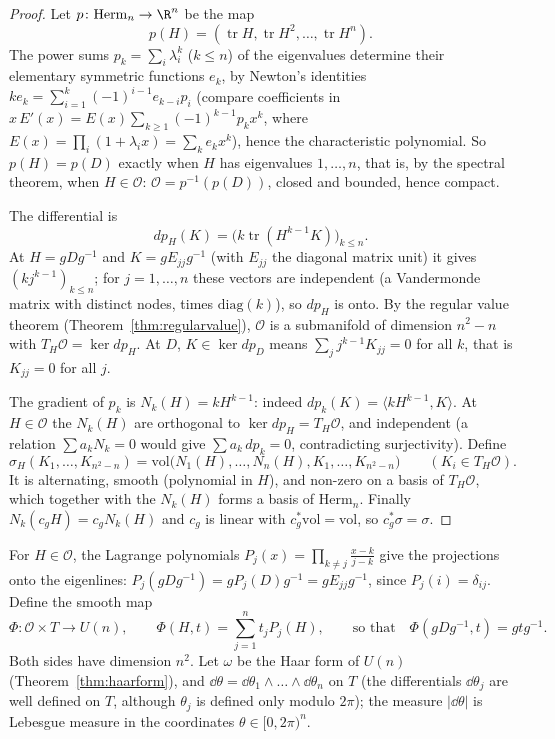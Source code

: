 \begin{proof}
Let $p\colon\mathrm{Herm}_n\to\R^n$ be the map
\[p(H)=(\operatorname{tr}H,\operatorname{tr}H^2,\dots,\operatorname{tr}H^n).\]
The power sums $p_k=\sum_i\lambda_i^k$ ($k\le n$) of the eigenvalues determine their elementary symmetric functions
$e_k$, by Newton's identities $ke_k=\sum_{i=1}^k(-1)^{i-1}e_{k-i}p_i$ (compare coefficients in $x\,E'(x)=E(x)\sum_{k\ge1}(-1)^{k-1}p_kx^k$, where $E(x)=\prod_i(1+\lambda_ix)=\sum_ke_kx^k$), hence the characteristic
polynomial. So $p(H)=p(D)$ exactly when $H$ has eigenvalues $1,\dots,n$, that is, by the spectral theorem, when $H\in\mathcal O$: $\mathcal O=p^{-1}(p(D))$, closed and bounded, hence compact.

The differential is
\[dp_H(K)=\bigl(k\operatorname{tr}(H^{k-1}K)\bigr)_{k\le n}.\]
At $H=gDg^{-1}$ and $K=gE_{jj}g^{-1}$ (with $E_{jj}$ the diagonal matrix unit) it gives $(kj^{k-1})_{k\le n}$; for
$j=1,\dots,n$ these vectors are independent (a Vandermonde matrix with distinct nodes, times $\mathrm{diag}(k)$), so $dp_H$ is onto. By the regular value theorem
(Theorem~\ref{thm:regularvalue}), $\mathcal O$ is a submanifold of dimension $n^2-n$ with $T_H\mathcal O=\ker dp_H$. At $D$, $K\in\ker dp_D$ means $\sum_jj^{k-1}K_{jj}=0$ for all $k$, that is
$K_{jj}=0$ for all $j$.

The gradient of $p_k$ is $N_k(H)=kH^{k-1}$: indeed $dp_k(K)=\langle kH^{k-1},K\rangle$. At $H\in\mathcal O$ the $N_k(H)$ are orthogonal to $\ker dp_H=T_H\mathcal O$, and independent (a relation $\sum a_kN_k=0$
would give $\sum a_k\,dp_k=0$, contradicting surjectivity). Define
\[\sigma_H(K_1,\dots,K_{n^2-n})=\mathrm{vol}\bigl(N_1(H),\dots,N_n(H),K_1,\dots,K_{n^2-n}\bigr)\qquad(K_i\in T_H\mathcal O).\]
It is alternating, smooth (polynomial in $H$), and non-zero on a basis of $T_H\mathcal O$, which together with the $N_k(H)$ forms a basis of $\mathrm{Herm}_n$. Finally $N_k(c_gH)=c_gN_k(H)$ and $c_g$ is linear
with $c_g^*\mathrm{vol}=\mathrm{vol}$, so $c_g^*\sigma=\sigma$.
\end{proof}

For $H\in\mathcal O$, the Lagrange polynomials $P_j(x)=\prod_{k\neq j}\frac{x-k}{j-k}$ give the projections onto the eigenlines: $P_j(gDg^{-1})=gP_j(D)g^{-1}=gE_{jj}g^{-1}$, since $P_j(i)=\delta_{ij}$.
Define the smooth map
\[\Phi\colon\mathcal O\times T\to U(n),\qquad\Phi(H,t)=\sum_{j=1}^nt_jP_j(H),\qquad\text{so that}\quad\Phi(gDg^{-1},t)=gtg^{-1}.\]
Both sides have dimension $n^2$. Let $\omega$ be the Haar form of $U(n)$ (Theorem~\ref{thm:haarform}), and $\dd\theta=\dd\theta_1\wedge\dots\wedge\dd\theta_n$ on $T$ (the differentials $\dd\theta_j$ are well defined on $T$,
although $\theta_j$ is defined only modulo $2\pi$); the measure $|\dd\theta|$ is Lebesgue measure in the coordinates $\theta\in[0,2\pi)^n$.

